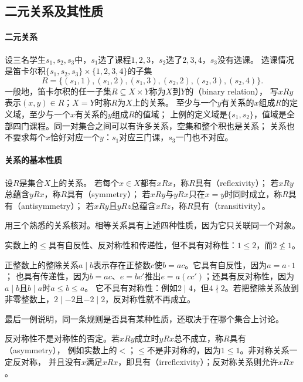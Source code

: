 \subsection{二元关系及其性质}
\label{sec:prelim-binary-relation-definition}
\label{sec:prelim-relation-properties}

\paragraph{二元关系}
设三名学生$s_1,s_2,s_3$中，$s_1$选了课程$1,2,3$，$s_2$选了$2,3,4$，$s_3$没有选课。
选课情况是笛卡尔积$\{s_1,s_2,s_3\}\times\{1,2,3,4\}$的子集
\[
 R=\{(s_1,1),(s_1,2),(s_1,3),(s_2,2),(s_2,3),(s_2,4)\}.
\]
一般地，笛卡尔积的任一子集$R\subseteq X\times Y$称为$X$到$Y$的（binary relation），
写$xRy$表示$(x,y)\in R$；$X=Y$时称$R$为$X$上的关系。
至少与一个$y$有关系的$x$组成$R$的定义域，至少与一个$x$有关系的$y$组成$R$的值域；
上例的定义域是$\{s_1,s_2\}$，值域是全部四门课程。同一对集合之间可以有许多关系，空集和整个积也是关系；
关系也不要求每个$x$恰好对应一个$y$：$s_1$对应三门课，$s_3$一门也不对应。

\paragraph{关系的基本性质}
设$R$是集合$X$上的关系。
若每个$x\in X$都有$xRx$，称$R$具有（reflexivity）；
若$xRy$总蕴含$yRx$，称$R$具有（symmetry）；
若$xRy$与$yRx$只在$x=y$时同时成立，称$R$具有（antisymmetry）；
若$xRy$且$yRz$总蕴含$xRz$，称$R$具有（transitivity）。

用三个熟悉的关系核对。相等关系具有上述四种性质，因为它只关联同一个对象。

实数上的$\leq$具有自反性、反对称性和传递性，但不具有对称性：$1\leq2$，而$2\not\leq1$。

\begin{example}[整除关系的性质]
\label{ex:sets-divisibility-properties}
正整数上的整除关系$a\mid b$表示存在正整数$c$使$b=ac$。它具有自反性，因为$a=a\cdot1$；
也具有传递性，因为$b=ac$、$e=bc'$推出$e=a(cc')$；还具有反对称性，因为$a\mid b$且$b\mid a$时$a\leq b\leq a$。
它不具有对称性：例如$2\mid4$，但$4\nmid2$。若把整除关系放到非零整数上，$2\mid-2$且$-2\mid2$，反对称性就不再成立。
\end{example}
最后一例说明，同一条规则是否具有某种性质，还取决于在哪个集合上讨论。

反对称性不是对称性的否定。若$xRy$成立时$yRx$总不成立，称$R$具有（asymmetry），
例如实数上的$<$；$\leq$不是非对称的，因为$1\leq1$。非对称关系一定反对称，
并且没有$x$满足$xRx$，即具有（irreflexivity）；反对称关系则允许$xRx$。

